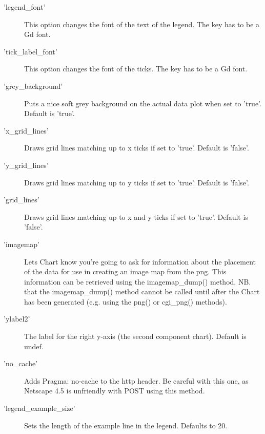 \begin{description}
\item['legend\_font'] This option changes the font of the text of the legend. The key has to be a Gd font. 

\item['tick\_label\_font'] This option changes the font of the ticks. The key has to be a Gd font. 

\item['grey\_background']Puts a nice soft grey background on the actual data plot when set to 'true'.  Default is 'true'.

\item['x\_grid\_lines']Draws grid lines matching up to x ticks if set to 'true'. Default is 'false'.

\item['y\_grid\_lines']Draws grid lines matching up to y ticks if set to 'true'. Default is 'false'.

\item['grid\_lines']Draws grid lines matching up to x and y ticks if set to 'true'. Default is 'false'. 

\item['imagemap']Lets Chart know you're going to ask for information 
        about the placement of the data for use in 
         creating an image map from the png. This information can be retrieved using the imagemap\_dump() method.         NB. that the imagemap\_dump() method cannot be called until 
         after the Chart has been generated (e.g. using the png() or cgi\_png() methods).

\item['ylabel2']The label for the right y-axis (the second component chart).  Default is undef.

\item['no\_cache']Adds Pragma: no-cache to the http header. 
           Be careful with this one, as Netscape 4.5 is     unfriendly with POST using this method.

\item['legend\_example\_size'] Sets the length of the example line in the legend. Defaults to 20.
\end{description}

